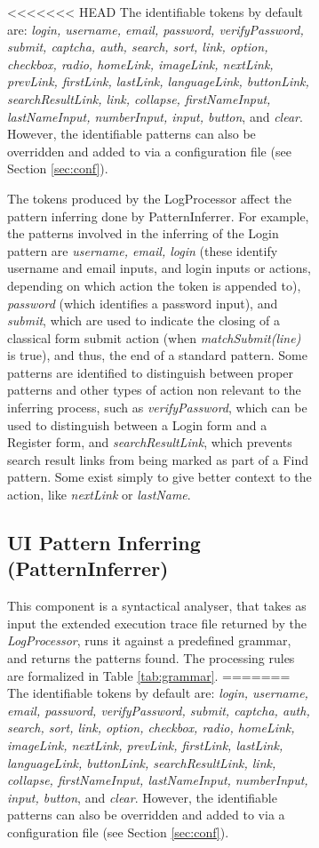 \documentclass[conference]{IEEEtran}
\begin{document}
\begin{enumerate}
\begin{figure}[!htb]
\begin{itemize}
\begin{figure}[!htb]
\begin{itemize}
<<<<<<< HEAD
The identifiable tokens by default are: \textit{login, username, email, password, verifyPassword, submit, captcha, auth, search, sort, link, option, checkbox, radio, homeLink, imageLink, nextLink, prevLink, firstLink, lastLink, languageLink, buttonLink, searchResultLink, link, collapse, firstNameInput, lastNameInput, numberInput, input, button}, and \textit{clear}. However, the identifiable patterns can also be overridden and added to via a configuration file (see Section \ref{sec:conf}).

The tokens produced by the LogProcessor affect the pattern inferring done by PatternInferrer. For example, the patterns involved in the inferring of the Login pattern are \textit{username, email, login} (these identify username and email inputs, and login inputs or actions, depending on which action the token is appended to), \textit{password} (which identifies a password input),  and \textit{submit}, which are used to indicate the closing of a classical form submit action (when \textit{matchSubmit(line)} is true), and thus, the end of a standard pattern. Some patterns are identified to distinguish between proper patterns and other types of action non relevant to the inferring process, such as \textit{verifyPassword}, which can be used to distinguish between a Login form and a Register form, and \textit{searchResultLink}, which prevents search result links from being marked as part of a Find pattern. Some exist simply to give better context to the action, like \textit{nextLink} or \textit{lastName}.

\subsection{UI Pattern Inferring (PatternInferrer)}\label{sec:inf}

This component is a syntactical analyser, that takes as input the extended execution trace file returned by the \textit{LogProcessor}, runs it against a predefined grammar, and returns the patterns found. The processing rules are formalized in Table \ref{tab:grammar}.
=======
The identifiable tokens by default are: \textit{login, username, email, password, verifyPassword, submit, captcha, auth, search, sort, link, option, checkbox, radio, homeLink, imageLink, nextLink, prevLink, firstLink, lastLink, languageLink, buttonLink, searchResultLink, link, collapse, firstNameInput, lastNameInput, numberInput, input, button}, and \textit{clear}. However, the identifiable patterns can also be overridden and added to via a configuration file (see Section \ref{sec:conf}).\\


\end{itemize}
\end{figure}
\end{itemize}
\end{figure}
\end{enumerate}
\end{document}
